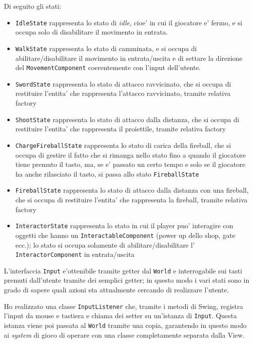 \documentclass[a4paper,12pt]{report}
\begin{document}
Di seguito gli stati:

\begin{itemize}
	\item \texttt{IdleState} rappresenta lo stato di \textit{idle}, cioe' in cui il giocatore e' fermo, e si occupa solo di disabilitare il movimento in entrata.
	\item \texttt{WalkState} rappresenta lo stato di camminata, e si occupa di abilitare/disabilitare il movimento in entrata/uscita e di settare la direzione del \texttt{MovementComponent} coerentemente con l'input dell'utente.
	\item \texttt{SwordState} rappresenta lo stato di attacco ravvicinato, che si occupa di restituire l'entita' che rappresenta l'attacco ravvicinato, tramite relativa factory
	\item \texttt{ShootState} rappresenta lo stato di attacco dalla distanza, che si occupa di restituire l'entita' che rappresenta il proiettile, tramite relativa factory
	\item \texttt{ChargeFireballState} rappresenta lo stato di carica della fireball, che si occupa di gestire il fatto che si rimanga nello stato fino a quando il giocatore tiene premuto il tasto, ma, se e' passato un certo tempo e solo se il giocatore ha anche rilasciato il tasto, si passa allo stato \texttt{FireballState}
	\item \texttt{FireballState} rappresenta lo stato di attacco dalla distanza con una fireball, che si occupa di restituire l'entita' che rappresenta la fireball, tramite relativa factory
	\item \texttt{InteractorState} rappresenta lo stato in cui il player puo' interagire con oggetti che hanno un \texttt{InteractableComponent} (power up dello shop, gate ecc.); lo stato si occupa solamente di abilitare/disabilitare l' \texttt{InteractorComponent} in entrata/uscita
\end{itemize}

L'interfaccia \texttt{Input} e'ottenibile tramite getter dal \texttt{World} e interrogabile sui tasti premuti dall'utente tramite dei semplici getter; in questo modo i vari stati sono in grado di sapere quali azioni sta attualmente cercando di realizzare l'utente.

Ho realizzato una classe \texttt{InputListener} che, tramite i metodi di Swing, registra l'input da mouse e tastiera e chiama dei setter su un'istanza di \texttt{Input}. Questa istanza viene poi passata al \texttt{World} tramite una copia, garantendo in questo modo ai \textit{system} di gioco di operare con una classe completamente separata dalla View.
\end{document}
